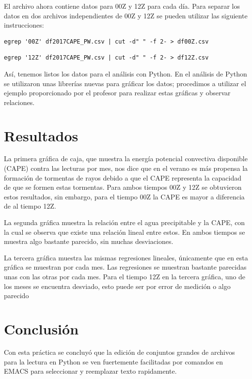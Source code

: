 \documentclass{article}
\begin{document}
\newpage

El archivo ahora contiene datos para 00Z y 12Z para cada día. Para separar los datos en dos archivos independientes de 00Z y 12Z se pueden utilizar las siguiente instrucciones:
\begin{verbatim}
egrep '00Z' df2017CAPE_PW.csv | cut -d" " -f 2- > df00Z.csv
\end{verbatim}

\begin{verbatim}
egrep '12Z' df2017CAPE_PW.csv | cut -d" " -f 2- > df12Z.csv
\end{verbatim}

Así, tenemos listos los datos para el análisis con Python. En el análisis de Python se utilizaron unas librerías nuevas para gráficar los datos; procedimos a utilizar el ejemplo proporcionado por el profesor para realizar estas gráficas y observar relaciones.

\section{Resultados}

La primera gráfica de caja, que muestra la energía potencial convectiva disponible (CAPE) contra las lecturas por mes, nos dice que en el verano es más propensa la formación de tormentas de rayos debido a que el CAPE representa la capacidad de que se formen estas tormentas. Para ambos tiempos 00Z y 12Z se obtuvieron estos resultados, sin embargo, para el tiempo 00Z la CAPE es mayor a diferencia de al tiempo 12Z.

La segunda gráfica muestra la relación entre el agua precipitable y la CAPE, con la cual se observa que existe una relación lineal entre estos. En ambos tiempos se muestra algo bastante parecido, sin muchas desviaciones.

La tercera gráfica muestra las mismas regresiones lineales, únicamente que en esta gráfica se muestran por cada mes. Las regresiones se muestran bastante parecidas unas con las otras por cada mes.
Para el tiempo 12Z en la tercera gráfica, uno de los meses se encuentra desviado, esto puede ser por error de medición o algo parecido

\section{Conclusión}

Con esta práctica se concluyó que la edición de conjuntos grandes de archivos para la lectura en Python se ven fuertemente facilitadas por comandos en EMACS para seleccionar y reemplazar texto rapidamente.
\end{document}
